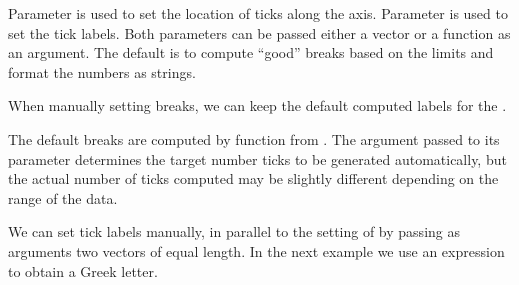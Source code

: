 \documentclass[krantz2]{krantz}\usepackage{knitr}
\begin{document}
Parameter  is used to set the location of ticks along the axis. Parameter  is used to set the tick labels. Both parameters can be passed either a vector or a function as an argument. The default is to compute ``good'' breaks based on the limits and format the numbers as strings.

When manually setting breaks, we can keep the default computed labels for the .

\begin{knitrout}\footnotesize
{}\color{fgcolor}\begin{kframe}
\begin{alltt}
  \hlopt{+}
  \hlstd{()} \hlopt{+}
  \hlstd{(} \hlstd{=} \hlstd{(} \hlopt{*} \hlstd{,} \hlstd{,} \hlstd{))}
\end{alltt}
\end{kframe}
\end{knitrout}

The default breaks are computed by function  from . The argument passed to its parameter  determines the target number ticks to be generated automatically, but the actual number of ticks computed may be slightly different depending on the range of the data.

\begin{knitrout}\footnotesize
{}\color{fgcolor}\begin{kframe}
\begin{alltt}
  \hlstd{(} \hlopt{::}\hlstd{(} \hlstd{=} \hlstd{))}
\end{alltt}
\end{kframe}
\end{knitrout}

We can set tick labels manually, in parallel to the setting of  by passing as arguments two vectors of equal length. In the next example we use an expression to obtain a Greek letter.
\end{document}
